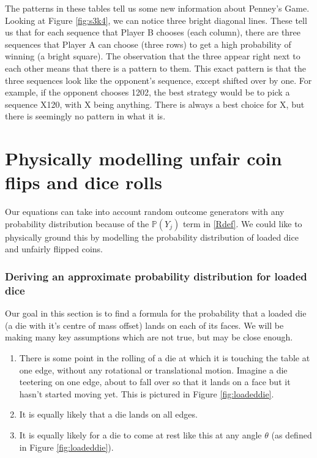 \documentclass[english,12pt,a4paper,final]{article}
\begin{document}
The patterns in these tables tell us some new information about Penney's Game. Looking at Figure \ref{fig:s3k4}, we can notice three bright diagonal lines. These tell us that for each sequence that Player B chooses (each column), there are three sequences that Player A can choose (three rows) to get a high probability of winning (a bright square). The observation that the three appear right next to each other means that there is a pattern to them. This exact pattern is that the three sequences look like the opponent's sequence, except shifted over by one. For example, if the opponent chooses 1202, the best strategy would be to pick a sequence X120, with X being anything. There is always a best choice for X, but there is seemingly no pattern in what it is.

\part {Physically modelling unfair coin flips and dice rolls \label{physicalModelling}}

Our equations can take into account random outcome generators with any probability distribution because of the $\mathbb{P}(Y_j)$ term in \eqref{Rdef}. We could like to physically ground this by modelling the probability distribution of loaded dice and unfairly flipped coins.

\section{Deriving an approximate probability distribution for loaded dice}

Our goal in this section is to find a formula for the probability that a loaded die (a die with it's centre of mass offset) lands on each of its faces. We will be making many key assumptions which are not true, but may be close enough.

\begin{enumerate}
	\item There is some point in the rolling of a die at which it is touching the table at one edge, without any rotational or translational motion. Imagine a die teetering on one edge, about to fall over so that it lands on a face but it hasn't started moving yet. This is pictured in Figure \ref{fig:loadeddie}.
	\item It is equally likely that a die lands on all edges.
	\item It is equally likely for a die to come at rest like this at any angle $\theta$ (as defined in Figure \ref{fig:loadeddie}).
\end{enumerate}
\end{document}
